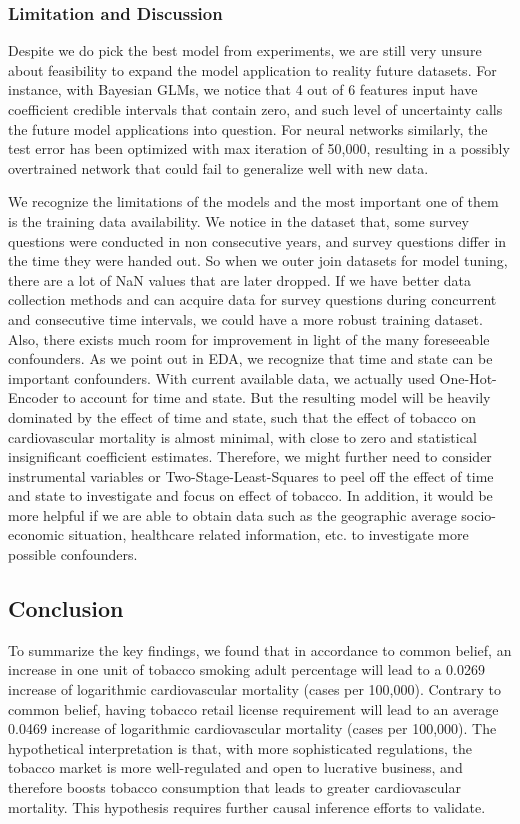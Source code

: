 \documentclass{article}
\begin{document}
\subsubsection{Limitation and Discussion}
Despite we do pick the best model from  experiments, we are still very unsure about feasibility to expand the model application to reality future datasets. For instance, with Bayesian GLMs, we notice that 4 out of 6 features input have coefficient credible intervals that contain zero, and such level of uncertainty calls the future model applications into question. For neural networks similarly, the test error has been optimized with max iteration of 50,000, resulting in a possibly overtrained network that could fail to generalize well with new data. 

We recognize the limitations of the models and the most important one of them is the training data availability. We notice in the dataset that, some survey questions were conducted in non consecutive years, and survey questions differ in the time they were handed out. So when we outer join datasets for model tuning, there are a lot of NaN values that are later dropped. If we have better data collection methods and can acquire data for survey questions during concurrent and consecutive time intervals, we could have a more robust training dataset. Also, there exists much room for improvement in light of the many foreseeable confounders. As we point out in EDA, we recognize that time and state can be important confounders. With current available data, we actually used One-Hot-Encoder to account for time and state. But the resulting model will be heavily dominated by the effect of time and state, such that the effect of tobacco on cardiovascular mortality is almost minimal, with close to zero and statistical insignificant coefficient estimates. Therefore, we might further need to consider instrumental variables or Two-Stage-Least-Squares to peel off the effect of time and state to investigate and focus on effect of tobacco. In addition, it would be more helpful if we are able to obtain data such as the geographic average socio-economic situation, healthcare related information, etc. to investigate more possible confounders. 

\subsection{Conclusion}
To summarize the key findings, we found that in accordance to common belief, an increase in one unit of tobacco smoking adult percentage will lead to a 0.0269 increase of logarithmic cardiovascular mortality (cases per 100,000). Contrary to common belief, having tobacco retail license requirement will lead to an average 0.0469 increase of logarithmic cardiovascular mortality (cases per 100,000). The hypothetical interpretation is that, with more sophisticated regulations, the tobacco market is more well-regulated and open to lucrative business, and therefore boosts tobacco consumption that leads to greater cardiovascular mortality. This hypothesis requires further causal inference efforts to validate. 
\end{document}
